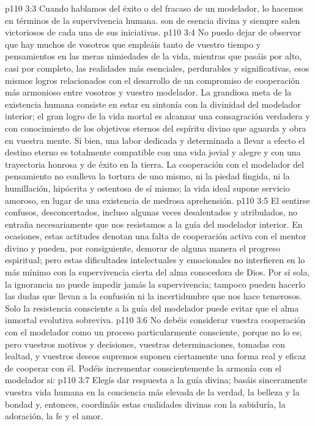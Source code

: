 \vs p110 3:3 Cuando hablamos del éxito o del fracaso de un modelador, lo hacemos en términos de la supervivencia humana.  son de esencia divina y siempre salen victoriosos de cada una de sus iniciativas.
\vs p110 3:4 \pc No puedo dejar de observar que hay muchos de vosotros que empleáis tanto de vuestro tiempo y pensamientos en las meras nimiedades de la vida, mientras que pasáis por alto, casi por completo, las realidades más esenciales, perdurables y significativas, esos mismos logros relacionados con el desarrollo de un compromiso de cooperación más armonioso entre vosotros y vuestro modelador. La grandiosa meta de la existencia humana consiste en estar en sintonía con la divinidad del modelador interior; el gran logro de la vida mortal es alcanzar una consagración verdadera y con conocimiento de los objetivos eternos del espíritu divino que aguarda y obra en vuestra mente. Si bien, una labor dedicada y determinada a llevar a efecto el destino eterno es totalmente compatible con una vida jovial y alegre y con una trayectoria honrosa y de éxito en la tierra. La cooperación con el modelador del pensamiento no conlleva la tortura de uno mismo, ni la piedad fingida, ni la humillación, hipócrita y ostentosa de sí mismo; la vida ideal supone servicio amoroso, en lugar de una existencia de medrosa aprehensión.
\vs p110 3:5 \pc El sentirse confusos, desconcertados, incluso algunas veces desalentados y atribulados, no entraña necesariamente que nos resistamos a la guía del modelador interior. En ocasiones, estas actitudes denotan una falta de cooperación activa con el mentor divino y pueden, por consiguiente, demorar de alguna manera el progreso espiritual; pero estas dificultades intelectuales y emocionales no interfieren en lo más mínimo con la supervivencia cierta del alma conocedora de Dios. Por sí sola, la ignorancia no puede impedir jamás la supervivencia; tampoco pueden hacerlo las dudas que llevan a la confusión ni la incertidumbre que nos hace temerosos. Solo la resistencia consciente a la guía del modelador puede evitar que el alma inmortal evolutiva sobreviva.
\vs p110 3:6 No debéis considerar vuestra cooperación con el modelador como un proceso particularmente consciente, porque no lo es; pero vuestros motivos y decisiones, vuestras determinaciones, tomadas con lealtad, y vuestros deseos supremos suponen ciertamente una forma real y eficaz de cooperar con él. Podéis incrementar conscientemente la armonía con el modelador si:
\vs p110 3:7 Elegís dar respuesta a la guía divina; basáis sinceramente vuestra vida humana en la conciencia más elevada de la verdad, la belleza y la bondad y, entonces, coordináis estas cualidades divinas con la sabiduría, la adoración, la fe y el amor.
